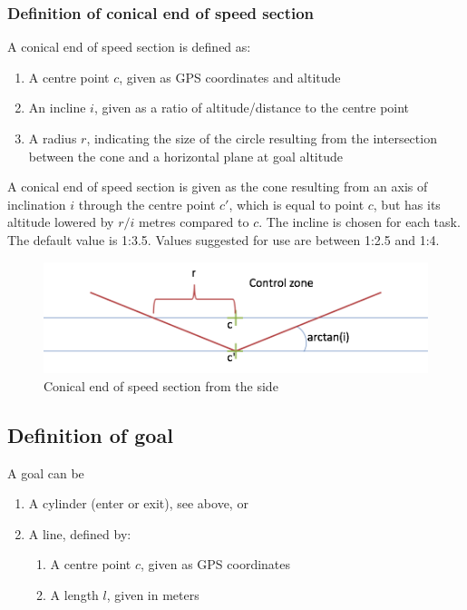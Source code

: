 \documentclass{article}
\begin{document}
\begin{pg}
\subsubsection{Definition of conical end of speed section}
\label{sec:define-CESS}
A conical end of speed section is defined as:
\begin{enumerate}
    \item A centre point \(c\), given as GPS coordinates and altitude
    \item
        An incline \(i\), given as a ratio of altitude/distance to the centre
        point
    \item
        A radius \(r\), indicating the size of the circle resulting from the
        intersection between the cone and a horizontal plane at goal altitude
\end{enumerate}

A conical end of speed section is given as the cone resulting from an axis of
inclination \(i\) through the centre point \(c'\), which is equal to point
\(c\), but has its altitude lowered by \(r/i\) metres compared to \(c\).  The
incline is chosen for each task. The default value is 1:3.5. Values suggested
for use are between
1:2.5 and 1:4.
\end{pg}
\begin{figure}[b]
    \includegraphics[scale=1]{img/conical-end.png}
    \caption{Conical end of speed section from the side}
\end{figure}

\subsection{Definition of goal}
\label{sec:goal-definition}
A goal can be
\begin{enumerate}
    \item A cylinder (enter or exit), see above, or
    \item A line, defined by:
    \begin{enumerate}
        \item A centre point \(c\), given as GPS coordinates
        \item A length \(l\), given in meters
    \end{enumerate}
\end{enumerate}
\end{document}
